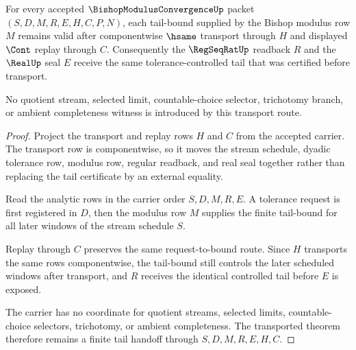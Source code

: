 \begin{theorem}
\label{thm:bishop-modulus-convergence-tail-transport}
For every accepted $\BishopModulusConvergenceUp$ packet $(S,D,M,R,E,H,C,P,N)$, each tail-bound supplied by the Bishop modulus row $M$ remains valid after componentwise $\hsame$ transport through $H$ and displayed $\Cont$ replay through $C$. Consequently the $\RegSeqRatUp$ readback $R$ and the $\RealUp$ seal $E$ receive the same tolerance-controlled tail that was certified before transport.

No quotient stream, selected limit, countable-choice selector, trichotomy branch, or ambient completeness witness is introduced by this transport route.
\end{theorem}
\begin{proof}
Project the transport and replay rows $H$ and $C$ from the accepted carrier. The transport row is componentwise, so it moves the stream schedule, dyadic tolerance row, modulus row, regular readback, and real seal together rather than replacing the tail certificate by an external equality.

Read the analytic rows in the carrier order $S,D,M,R,E$. A tolerance request is first registered in $D$, then the modulus row $M$ supplies the finite tail-bound for all later windows of the stream schedule $S$.

Replay through $C$ preserves the same request-to-bound route. Since $H$ transports the same rows componentwise, the tail-bound still controls the later scheduled windows after transport, and $R$ receives the identical controlled tail before $E$ is exposed.

The carrier has no coordinate for quotient streams, selected limits, countable-choice selectors, trichotomy, or ambient completeness. The transported theorem therefore remains a finite tail handoff through $S,D,M,R,E,H,C$.
\end{proof}


\begin{closurestatus}{\BishopModulusConvergenceUp}
  \theoryclosure{\seedClosure}
  \formalstatus{\unformalizedV}
\end{closurestatus}
